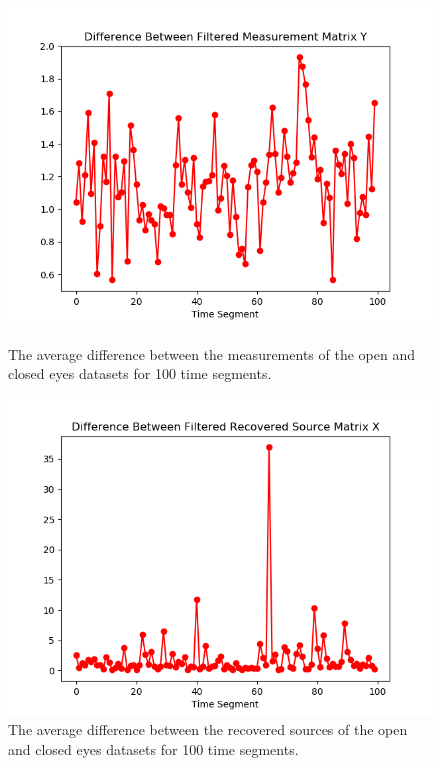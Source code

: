 \begin{figure}[H]
\begin{widepage}
    \begin{minipage}[t]{.49\textwidth}
\centering
\includegraphics[width=1\linewidth]{figures/ch_7/DFT_Y_Difference.png}
\caption{The average difference between the measurements of the open and closed eyes datasets for 100 time segments.}
\label{fig:dft4}
\end{minipage} 
\hspace{.5cm}
\begin{minipage}[t]{.49\textwidth}
\centering
\includegraphics[width=1\linewidth]{figures/ch_7/DFT_X_Difference.png}
\caption{The average difference between the recovered sources of the open and closed eyes datasets for 100 time segments.}
	\label{fig:dft5}
    \end{minipage}
\end{widepage}
\end{figure}
\noindent